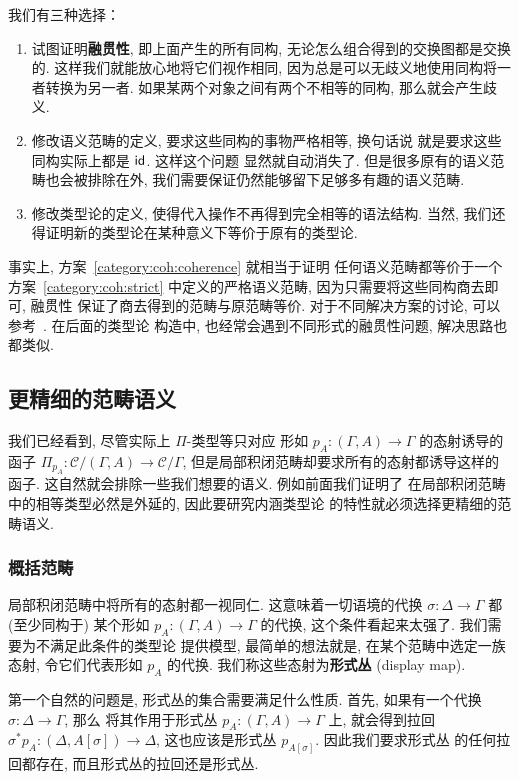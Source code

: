 我们有三种选择：
\begin{enumerate}
\item\label{category:coh:coherence} 试图证明\textbf{融贯性},
即上面产生的所有同构, 无论怎么组合得到的交换图都是交换的.
这样我们就能放心地将它们视作相同,
因为总是可以无歧义地使用同构将一者转换为另一者.
如果某两个对象之间有两个不相等的同构, 那么就会产生歧义.
\item\label{category:coh:strict} 修改语义范畴的定义,
要求这些同构的事物严格相等, 换句话说
就是要求这些同构实际上都是 \(\textnormal{\textsf{id}}\). 这样这个问题
显然就自动消失了. 但是很多原有的语义范畴也会被排除在外,
我们需要保证仍然能够留下足够多有趣的语义范畴.
\item\label{category:coh:weak} 修改类型论的定义,
使得代入操作不再得到完全相等的语法结构. 当然,
我们还得证明新的类型论在某种意义下等价于原有的类型论.
\end{enumerate}
事实上, 方案~\ref{category:coh:coherence} 就相当于证明
任何语义范畴都等价于一个方案~\ref{category:coh:strict}
中定义的严格语义范畴, 因为只需要将这些同构商去即可, 融贯性
保证了商去得到的范畴与原范畴等价. 对于不同解决方案的讨论,
可以参考~\cite{curien:2014:revisit}. 在后面的类型论
构造中, 也经常会遇到不同形式的融贯性问题, 解决思路也都类似.

\subsection{更精细的范畴语义}
我们已经看到, 尽管实际上 \(\Pi\)-类型等只对应
形如 \(p_A : (\Gamma, A) \to \Gamma\) 的态射诱导的
函子 \(\Pi_{p_A} : \mathcal C/(\Gamma, A) \to \mathcal C/\Gamma\),
但是局部积闭范畴却要求所有的态射都诱导这样的函子.
这自然就会排除一些我们想要的语义. 例如前面我们证明了
在局部积闭范畴中的相等类型必然是外延的, 因此要研究内涵类型论
的特性就必须选择更精细的范畴语义.

\subsubsection{概括范畴}
局部积闭范畴中将所有的态射都一视同仁.
这意味着一切语境的代换 \(\sigma : \Delta \to \Gamma\)
都 (至少同构于) 某个形如 \(p_A : (\Gamma, A) \to \Gamma\)
的代换, 这个条件看起来太强了. 我们需要为不满足此条件的类型论
提供模型, 最简单的想法就是, 在某个范畴中选定一族态射,
令它们代表形如 \(p_A\) 的代换.
我们称这些态射为\textbf{形式丛} (display map).

第一个自然的问题是, 形式丛的集合需要满足什么性质. 首先,
如果有一个代换 \(\sigma : \Delta \to \Gamma\), 那么
将其作用于形式丛 \(p_A : (\Gamma, A) \to \Gamma\) 上,
就会得到拉回 \(\sigma^* p_A : (\Delta, A[\sigma]) \to \Delta\),
这也应该是形式丛 \(p_{A[\sigma]}\). 因此我们要求形式丛
的任何拉回都存在, 而且形式丛的拉回还是形式丛.

